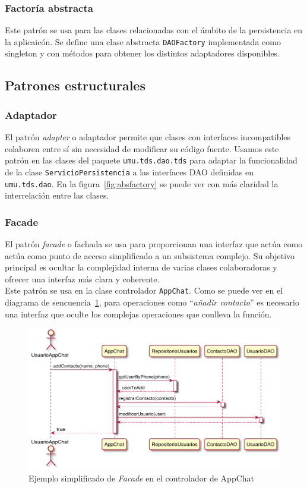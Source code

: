 \documentclass[11pt]{article}
\begin{document}
\subsubsection*{Factoría abstracta}

Este patrón se usa para las clases relacionadas con el ámbito de la persistencia en la aplicaicón. Se define una clase abstracta \texttt{DAOFactory} implementada como singleton y con métodos para obtener los distintos adaptadores disponibles. 

\subsection{Patrones estructurales}

\subsubsection*{Adaptador}

El patrón \textit{adapter} o adaptador permite que clases con interfaces incompatibles colaboren entre sí sin necesidad de modificar su código fuente. Usamos este patrón en las clases del paquete \texttt{umu.tds.dao.tds} para adaptar la funcionalidad de la clase \texttt{ServicioPersistencia} a las interfaces DAO definidas en \texttt{umu.tds.dao}. En la figura~\ref{fig:absfactory} se puede ver con más claridad la interrelación entre las clases.

\subsubsection*{Facade}

El patrón \textit{facade} o fachada se usa para proporcionan una interfaz que actúa como actúa como punto de acceso simplificado a un subsistema complejo. Su objetivo principal es ocultar la complejidad interna de varias clases colaboradoras y ofrecer una interfaz más clara y coherente.~\cite{refactoringGuruFacade}\\

Este patrón se usa en la clase controlador \texttt{AppChat}. Como se puede ver en el diagrama de sencuencia~\ref{fig:facade}, para operaciones como ``\textit{añadir contacto}'' es necesario una interfaz que oculte los complejas operaciones que conlleva la función.

\begin{figure}[H]
	\centering
	\includegraphics[width=0.86\linewidth]{figures/facade}
	\caption{Ejemplo simplificado de \textit{Facade} en el controlador de AppChat}
	\label{fig:facade}
\end{figure}
\end{document}
